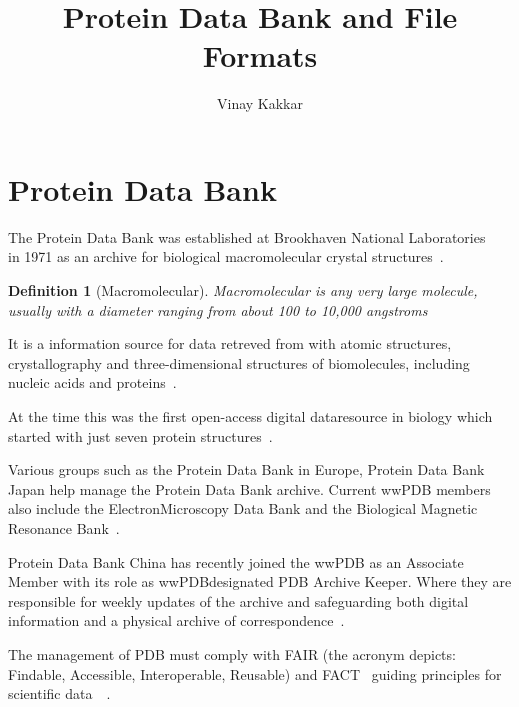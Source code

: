 \documentclass{report}
\title{Protein Data Bank and File Formats}
\author{Vinay Kakkar}
\newtheorem{definition}{Definition}[section]
\begin{document}
\maketitle

\tableofcontents

\begin{abstract}


\end{abstract}

\renewcommand\thesection{\arabic{section}}

\section{Protein Data Bank}

The Protein Data Bank was established at Brookhaven National Laboratories ~\cite{bernstein_protein_1977} in 1971 as an archive for biological macromolecular crystal structures~\cite{berman_protein_2000}.

\begin{definition}[Macromolecular]
    Macromolecular is any very large molecule, usually with a diameter ranging from about 100 to 10,000 angstroms
\end{definition}

It is a information source for data retreved from with atomic structures, crystallography and three-dimensional structures of biomolecules, including nucleic acids and proteins~\cite{behzadi_worldwide_2021}. 

At the time this was the first open-access digital dataresource in biology which started with just seven protein structures~\cite{burley_rcsb_2022}.

Various groups such as the Protein Data Bank in Europe, Protein Data Bank Japan help manage the Protein Data Bank archive. Current wwPDB members also include the ElectronMicroscopy Data Bank and the Biological Magnetic Resonance Bank~\cite{burley_rcsb_2022}.

Protein Data Bank China has recently joined the wwPDB as an Associate Member with its role as wwPDBdesignated PDB Archive Keeper. Where they are responsible for weekly updates of the archive and safeguarding both digital information and a physical archive of correspondence~\cite{burley1_rcsb_2022}.

The management of PDB must comply with FAIR (the acronym depicts: Findable, Accessible, Interoperable, Reusable) and FACT~\cite{van_der_aalst_responsible_2017} guiding principles for scientific data~\cite{wilkinson_fair_2016}~\cite{westbrook_impact_2020}.
\end{document}
